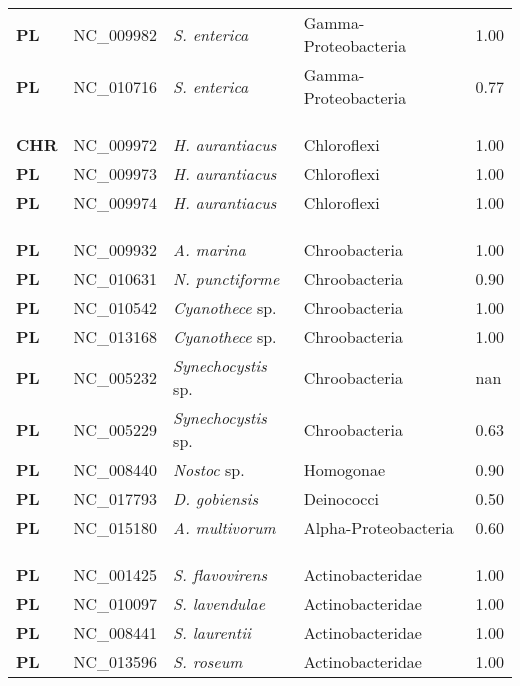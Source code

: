 \begin{adjustwidth}{-3cm}{2cm}
{\begin{supertabular}{>{\bfseries}l|p{0.1\textwidth}p{0.14\textwidth}l|l}
PL & NC\_009982 & \textit{S. enterica} & Gamma-Proteobacteria & 1.00\\
PL & NC\_010716 & \textit{S. enterica} & Gamma-Proteobacteria & 0.77\\
\\
\\
\hline\\
CHR & NC\_009972 & \textit{H. aurantiacus} & Chloroflexi & 1.00\\
PL & NC\_009973 & \textit{H. aurantiacus} & Chloroflexi & 1.00\\
PL & NC\_009974 & \textit{H. aurantiacus} & Chloroflexi & 1.00\\
\\
\\
\hline\\
PL & NC\_009932 & \textit{A. marina} & Chroobacteria & 1.00\\
PL & NC\_010631 & \textit{N. punctiforme} & Chroobacteria & 0.90\\
PL & NC\_010542 & \textit{Cyanothece} sp. & Chroobacteria & 1.00\\
PL & NC\_013168 & \textit{Cyanothece} sp. & Chroobacteria & 1.00\\
PL & NC\_005232 & \textit{Synechocystis} sp. & Chroobacteria & nan\\
PL & NC\_005229 & \textit{Synechocystis} sp. & Chroobacteria & 0.63\\
PL & NC\_008440 & \textit{Nostoc} sp. & Homogonae & 0.90\\
PL & NC\_017793 & \textit{D. gobiensis} & Deinococci & 0.50\\
PL & NC\_015180 & \textit{A. multivorum} & Alpha-Proteobacteria & 0.60\\
\\
\\
\hline\\
PL & NC\_001425 & \textit{S. flavovirens} & Actinobacteridae & 1.00\\
PL & NC\_010097 & \textit{S. lavendulae} & Actinobacteridae & 1.00\\
PL & NC\_008441 & \textit{S. laurentii} & Actinobacteridae & 1.00\\
PL & NC\_013596 & \textit{S. roseum} & Actinobacteridae & 1.00\\

\end{supertabular}}
\end{adjustwidth}
